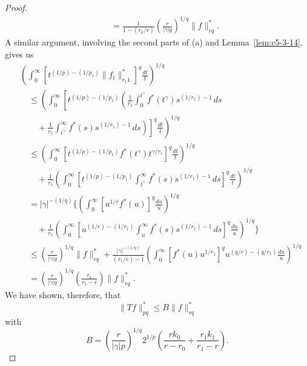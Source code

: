 \begin{proof}
\begin{align*}
&\quad=\frac{1}{1-(r_{0}/r)}\left(\frac{r}{|\gamma|q}\right)^{1/q}\|f\|_{rq}^{*}.
\end{align*}
A similar argument, involving the second parts of (a) and
Lemma~\ref{lem:c5-3-14}, gives us
\begin{align*}
&\left(\int_{0}^{\infty}[t^{(1/p)-(1/p_{1})}\|f_{t}\|_{r_{1}1}^{*}]^{q}\frac{dt}{t}\right)^{1/q}\\
&\quad\leq\left(\int_{0}^{\infty}\left[t^{(1/p)-(1/p_{1})}\left(\frac{1}{r_{1}}\int_{0}^{t^{\gamma}}f^{*}(t^{\gamma})s^{(1/r_{1})-1}\,ds\right.\right.\right.\\
&\quad\quad\left.\left.\left.{}+\frac{1}{r_{1}}\int_{t^{\gamma}}^{\infty}f^{*}(s)s^{(1/r_{1})-1}\,ds\right)\right]^{q}\frac{dt}{t}\right)^{1/q}\\
&\quad\leq\left(\int_{0}^{\infty}[t^{(1/p)-(1/p_{1})}f^{*}(t^{\gamma})t^{\gamma/r_{1}}]^{q}\frac{dt}{t}\right)^{1/q}\\
&\quad\quad+\frac{1}{r_{1}}\left(\int_{0}^{\infty}\left[t^{(1/p)-(1/p_{1})}\int_{t^{\gamma}}^{\infty}f^{*}(s)s^{(1/r_{1})-1}\,ds\right]^{q}\frac{dt}{t}\right)^{1/q}\\
&\quad=|\gamma|^{-(1/q)}\Biggl\{\left(\int_{0}^{\infty}[u^{1/r}f^{*}(u)]^{q}\frac{du}{u}\right)^{1/q}\\
&\quad\quad+\frac{1}{r_{1}}\left(\int_{0}^{\infty}\left[u^{(1/r)-(1/r_{1})}\int_{u}^{\infty}f^{*}(s)s^{(1/r_{1})-1}\,ds\right]^{q}\frac{du}{u}\right)^{1/q}\Biggr\}\\
&\quad\leq\left(\frac{r}{|\gamma|q}\right)^{1/q}\|f\|_{rq}^{*}
+\frac{|\gamma|^{-(1/q)}}{(r_{1}/r)-1}
\!\left(\int_{0}^{\infty}[f^{*}(u)u^{1/r_{1}}]^{q}u^{(q/r)-(q/r_{1})}\frac{du}{u}\right)^{1/q}\\
&\quad=\left(\frac{r}{|\gamma|q}\right)^{1/q}\left(\frac{r_{1}}{r_{1}-r}\right)\|f\|_{rq}^{*}.
\end{align*}
We have shown, therefore, that
\[
\|Tf\|_{pq}^{*}\leq B\|f\|_{rq}^{*}
\]
with
\[
B=\left(\frac{r}{|\gamma|p}\right)^{1/q}2^{1/p}
\left(\frac{rk_{0}}{r-r_{0}}+\frac{r_{1}k_{1}}{r_{1}-r}\right).
\]


\end{proof}
